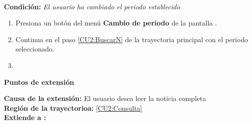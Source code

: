 \begin{large}
	\\
\end{large}	
\textbf{Condición:} \textit{El usuario ha cambiado el periodo establecido}

\begin{enumerate}[{A-}1.]

	\item \actor Presiona un botón del menú \textbf{Cambio de periodo} de la pantalla .

	\item \sistema Continua en el paso \ref{CU2:BuscarN} de la trayectoria principal con el periodo seleccionado.

	\item \finTA

\end{enumerate}




\begin{large}
	\textbf{Puntos de extensión}\\
\end{large}	

\textbf{Causa de la extensión:} El usuario desea leer la noticia completa\\
\textbf{Región de la trayectorioa:} \ref{CU2:Consulta}\\
\textbf{Extiende a :} \\\\

